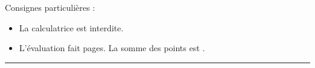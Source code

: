 

\SetDate[02/04/2026]
\reversemarginpar
\setlength{\marginparsep}{.5cm}


\pagestyle{fancy}
\fancyhead[R]{\today}

\null\vspace{-30pt}
Consignes particulières : 
\begin{itemize}[label=$\bullet$]
	\item 
	La calculatrice est {interdite}.
	\item
	L'évaluation fait \pageref{lastpage} pages. La somme des points est .
\end{itemize}

\marginpar{[pts]}
\hrule





